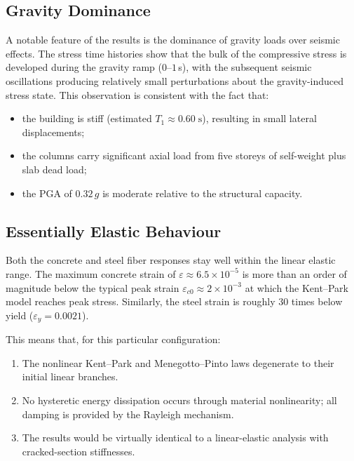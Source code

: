 \subsection{Gravity Dominance}

A notable feature of the results is the dominance of gravity loads over
seismic effects.  The stress time histories show that the bulk of the
compressive stress is developed during the gravity ramp ($0$--$1$\,s),
with the subsequent seismic oscillations producing relatively small
perturbations about the gravity-induced stress state.  This observation
is consistent with the fact that:
%
\begin{itemize}[nosep]
  \item the building is stiff (estimated $T_1 \approx 0.60\;\mathrm{s}$),
        resulting in small lateral displacements;
  \item the columns carry significant axial load from five storeys of
        self-weight plus slab dead load;
  \item the PGA of $0.32\,g$ is moderate relative to the structural
        capacity.
\end{itemize}

\subsection{Essentially Elastic Behaviour}

Both the concrete and steel fiber responses stay well within the linear
elastic range.  The maximum concrete strain of
$\varepsilon \approx 6.5 \times 10^{-5}$ is more than an order of
magnitude below the typical peak strain $\varepsilon_{c0} \approx
2 \times 10^{-3}$ at which the Kent--Park model reaches peak stress.
Similarly, the steel strain is roughly 30 times below yield
($\varepsilon_y = 0.0021$).

This means that, for this particular configuration:
%
\begin{enumerate}[nosep]
  \item The nonlinear Kent--Park and Menegotto--Pinto laws degenerate
        to their initial linear branches.
  \item No hysteretic energy dissipation occurs through material
        nonlinearity; all damping is provided by the Rayleigh mechanism.
  \item The results would be virtually identical to a linear-elastic
        analysis with cracked-section stiffnesses.
\end{enumerate}

